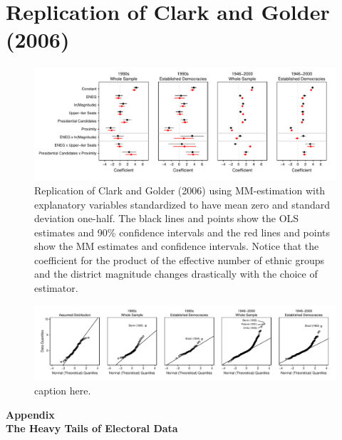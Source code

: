 \documentclass[12pt]{article}
\begin{document}
\singlespace

%



\section*{Replication of Clark and Golder (2006)}

\begin{figure}[H]
\begin{center}
\includegraphics[scale = .8]{figs/cg-coef-plots.pdf}
\caption{Replication of Clark and Golder (2006) using MM-estimation with explanatory variables standardized to have mean zero and standard deviation one-half. The black lines and points show the OLS estimates and 90\% confidence intervals and the red lines and points show the MM estimates and confidence intervals. Notice that the coefficient for the product of the effective number of ethnic groups and the district magnitude changes drastically with the choice of estimator.}\label{fig:cg-coef-plots}
\end{center}
\end{figure}

\begin{figure}[H]
\begin{center}
\includegraphics[width = \textwidth]{figs/cg-qq-plots.pdf}
\caption{caption here.}\label{fig:cg-coef-plots}
\end{center}
\end{figure}

\newpage
\doublespace
\begin{appendix}
\begin{center}
\textbf{{\LARGE Appendix}}\\\vspace{2mm}
\textbf{{\large The Heavy Tails of Electoral Data}}\\\vspace{2mm}

\end{center}
\section{}


\end{appendix}
\end{document}
